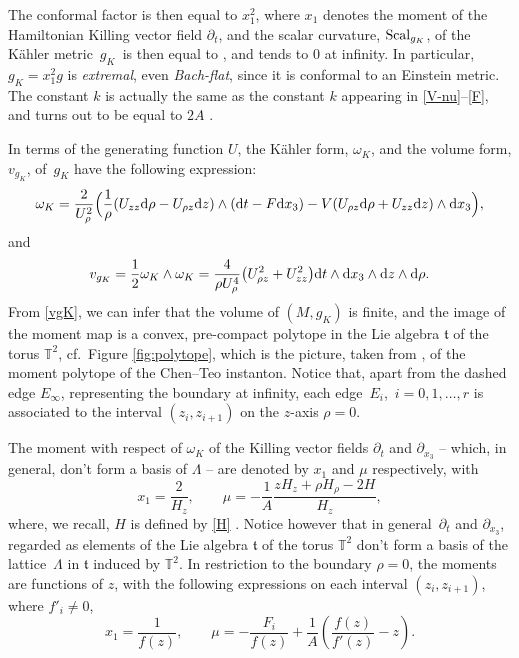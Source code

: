 \documentclass[10pt,a4paper]{amsart}
\numberwithin{equation}{section}
\begin{document}
The conformal factor  is then equal to $x _1 ^2$, where $x _1$ denotes the moment of the Hamiltonian Killing vector field $\partial _t$, and
the scalar curvature, ${\rm Scal} _{g_K}$, of the K\"ahler metric~$g _K$~is then equal to , and tends to $0$ at infinity. In particular, $g_K = x _1 ^2 g$ is {\it extremal}, even {\it Bach-flat}, since it is conformal to an Einstein metric. The constant $k$ is actually the same as the constant $k$ appearing in \eqref{V-nu}--\eqref{F}, and turns out to be equal to $2 A$ \cite[equation (89)]{BG}.

In terms of the generating function $U$, the K\"ahler form, $\omega _K$, and the volume form, $v _{g _K}$, of~$g_K$ have the following expression:
\[ \label{omega-K } \omega _K = \frac{2}{U_{\rho} ^2} \Big(\frac{1}{\rho} (U_{z z} {\rm d}\rho - U_{\rho z} {\rm d}z) \wedge ({\rm d}t - F {\rm d} x_3) - V (U_{\rho z} {\rm d} \rho + U_{z z} {\rm d}z) \wedge {\rm d} x _3\Big), \]
and
\begin{gather} \label{vgK} v _{g _K} = \frac{1}{2} \omega _K \wedge \omega _K = \frac{4}{\rho U_{\rho} ^4} \big(U_{\rho z} ^2 + U_{z z} ^2\big) {\rm d}t \wedge {\rm d} x _3 \wedge {\rm d} z \wedge {\rm d} \rho. \end{gather}
From \eqref{vgK}, we can infer that the volume of $(M, g _K)$ is finite, and the image of the moment map is a convex, pre-compact polytope in the Lie algebra $\mathfrak{t}$ of the torus $\mathbb{T} ^2$, cf.\ Figure \ref{fig:polytope}, which is the picture, taken from \cite[Section~8]{BG}, of the moment polytope of the Chen--Teo instanton. Notice that, apart from the dashed edge $E _{\infty}$, representing the boundary at infinity, each edge~$E _i$,~${i = 0, 1, \dots, r}$ is associated to the interval $(z _i, z _{i + 1})$ on the $z$-axis $\rho = 0$.

The moment with respect of $\omega _K$ of the Killing vector fields $\partial _t$ and $\partial _{x_3}$ -- which, in general, don't form a basis of $\Lambda$ -- are denoted by $x _1$ and $\mu$ respectively, with
\[%
 x _1 = \frac{2}{H_z}, \qquad \mu = - \frac{1}{A} \frac{z H _z + \rho H_{\rho} - 2 H}{H_z}, \]
where, we recall, $H$ is defined by \eqref{H} \cite[Proposition 6.1]{BG}. Notice however that in general~$\partial _t$ and $\partial _{x_3}$, regarded as elements of the Lie algebra $\mathfrak{t}$ of the torus $\mathbb{T} ^2$ don't form a basis of the lattice~$\Lambda$ in $\mathfrak{t}$ induced by $\mathbb{T} ^2$. In restriction to the boundary $\rho = 0$, the moments are functions of $z$, with the following expressions on each interval $(z _i, z _{i + 1})$, where $f'_i \neq 0$,
\[%
 x_1 = \frac{1}{f (z)}, \qquad \mu = - \frac{F_i}{f (z)} + \frac{1}{A} \left(\frac{f (z)}{f' (z)} - z\right). \]
\end{document}
